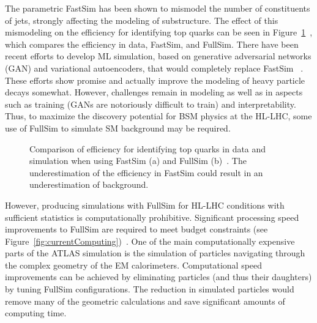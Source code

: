 \documentclass[letter, USenglish, 11pt, subfigure]{article}
\begin{document}
The parametric FastSim has been shown to mismodel the number of constituents of jets, strongly affecting the modeling of substructure. The effect of this mismodeling on the efficiency for identifying top quarks can be seen in Figure~\ref{fig:topTagEff}~\cite{hcw2018}, which compares the efficiency in data, FastSim, and FullSim. There have been recent efforts to develop ML simulation, based on generative adversarial networks (GAN) and variational autoencoders, that would completely replace FastSim ~\cite{calogan,atlasgan}. These efforts show promise and actually improve the modeling of heavy particle decays somewhat. However, challenges remain in modeling as well as in aspects such as training (GANs are notoriously difficult to train) and interpretability. Thus, to maximize the discovery potential for BSM physics at the HL-LHC, some use of FullSim to simulate SM background may be required. 

\begin{figure}[!htbp]
  \centering
  \caption{\label{fig:topTagEff} Comparison of efficiency for identifying top quarks in data and simulation when using FastSim (a) and FullSim (b)~\cite{hcw2018}. The underestimation of the efficiency in FastSim could result in an underestimation of background. }
\end{figure}

However, producing simulations with FullSim for HL-LHC conditions with sufficient statistics is computationally prohibitive. Significant processing speed improvements to FullSim are required to meet budget constraints (see Figure~\ref{fig:currentComputing})~\cite{computingCDR}. One of the main computationally expensive parts of the ATLAS simulation is the simulation of particles navigating through the complex geometry of the EM calorimeters. Computational speed improvements can be achieved by eliminating particles (and thus their daughters) by tuning FullSim configurations. The reduction in simulated particles would remove many of the geometric calculations and save significant amounts of computing time.
\end{document}
